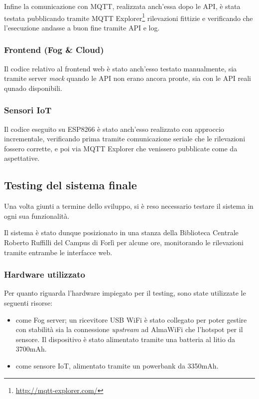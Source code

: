 Infine la comunicazione con MQTT, realizzata anch'essa dopo le API, è stata testata pubblicando tramite MQTT Explorer\footnote{\url{http://mqtt-explorer.com/}} rilevazioni fittizie e verificando che l'esecuzione andasse a buon fine tramite API e log.

\subsubsection[Frontend]{Frontend (Fog \& Cloud)}

Il codice relativo al frontend web è stato anch'esso testato manualmente, sia tramite server \emph{mock} quando le API non erano ancora pronte, sia con le API reali qunado disponibili.

\subsubsection{Sensori IoT}

Il codice eseguito su ESP8266 è stato anch'esso realizzato con approccio incrementale, verificando prima tramite comunicazione seriale che le rilevazioni fossero corrette, e poi via MQTT Explorer che venissero pubblicate come da aspettative.

\subsection{Testing del sistema finale}

Una volta giunti a termine dello sviluppo, si è reso necessario testare il sistema in ogni sua funzionalità.

Il sistema è stato dunque posizionato in una stanza della Biblioteca Centrale Roberto Ruffilli del Campus di Forlì per alcune ore, monitorando le rilevazioni tramite entrambe le interfacce web.

\subsubsection{Hardware utilizzato}

Per quanto riguarda l'hardware impiegato per il testing, sono state utilizzate le seguenti risorse:

\begin{itemize}
  \item
     come Fog server;
    un ricevitore USB WiFi è stato collegato per poter gestire con stabilità sia la connessione \emph{upstream} ad AlmaWiFi che l'hotspot per il sensore.
    Il dispositivo è stato alimentato tramite una batteria al litio da 3700mAh.
  \item {} come sensore IoT, alimentato tramite un powerbank da 3350mAh.
\end{itemize}

